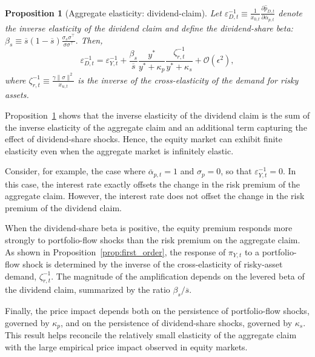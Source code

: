 \documentclass[12pt,english]{article}
\newtheorem{prop}{Proposition}
\begin{document}
\begin{prop}[Aggregate elasticity: dividend-claim]\label{prop_elasticity_dividend_claim}
Let $\varepsilon_{D,t}^{-1} \equiv \frac{1}{x_{0,t}} \frac{\partial \hat{p}_{D,t}}{\partial \overline{\alpha}_{p,t}}$ denote the inverse elasticity of the dividend claim and define the dividend-share beta:
$
    \beta_s
    \equiv
    \overline{s}(1-\overline{s})
    \frac{\sigma_s \sigma^\top}{\sigma \sigma^\top}.
$
Then,
\begin{equation}\label{eq:elasticity_dividend_claim}
    \varepsilon_{D,t}^{-1}
    =
    \varepsilon_{Y,t}^{-1}
    +
    \frac{\beta_s}{\overline{s}}
    \frac{y^*}{y^*+\kappa_p}
    \frac{\zeta_{r,t}^{-1}}{y^*+\kappa_s}
    +
    \mathcal{O}(\epsilon^2),
\end{equation}
where
$
    \zeta_{r,t}^{-1}
    \equiv
    \frac{\gamma\|\sigma\|^2}{x_{u,t}}
$
is the inverse of the cross-elasticity of the demand for risky assets.
\end{prop}

Proposition~\ref{prop_elasticity_dividend_claim} shows that the inverse elasticity of the dividend claim is the sum of the inverse elasticity of the aggregate claim and an additional term capturing the effect of dividend-share shocks.
Hence, the equity market can exhibit finite elasticity even when the aggregate market is infinitely elastic.

Consider, for example, the case where $\overline{\alpha}_{p,t}=1$ and $\sigma_p = 0$, so that $\varepsilon_{Y,t}^{-1}=0$.
In this case, the interest rate exactly offsets the change in the risk premium of the aggregate claim.
However, the interest rate does not offset the change in the risk premium of the dividend claim.

When the dividend-share beta is positive, the equity premium responds more strongly to portfolio-flow shocks than the risk premium on the aggregate claim.
As shown in Proposition~\ref{prop:first_order}, the response of $\pi_{Y,t}$ to a portfolio-flow shock is determined by the inverse of the cross-elasticity of risky-asset demand, $\zeta_{r,t}^{-1}$.
The magnitude of the amplification depends on the levered beta of the dividend claim, summarized by the ratio $\beta_s/\overline{s}$.

Finally, the price impact depends both on the persistence of portfolio-flow shocks, governed by $\kappa_p$, and on the persistence of dividend-share shocks, governed by $\kappa_s$.
This result helps reconcile the relatively small elasticity of the aggregate claim with the large empirical price impact observed in equity markets.
\end{document}

